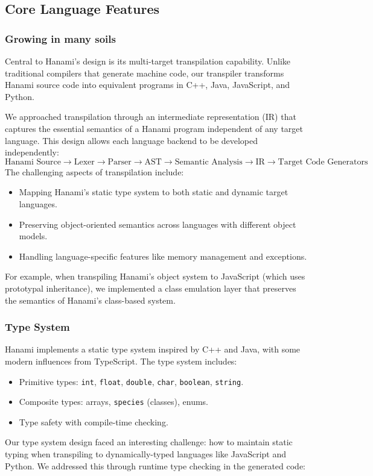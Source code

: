 \documentclass[conference]{IEEEtran}
\begin{document}
\subsection{Core Language Features}

\subsubsection{Growing in many soils}
Central to Hanami's design is its multi-target transpilation capability. Unlike traditional compilers that generate machine code, our transpiler transforms Hanami source code into equivalent programs in C++, Java, JavaScript, and Python.

We approached transpilation through an intermediate representation (IR) that captures the essential semantics of a Hanami program independent of any target language. This design allows each language backend to be developed independently:
\[
\text{Hanami Source} \rightarrow \text{Lexer} \rightarrow \text{Parser} \rightarrow \text{AST} \rightarrow \text{Semantic Analysis} \rightarrow \text{IR} \rightarrow \text{Target Code Generators}
\]
The challenging aspects of transpilation include:
\begin{itemize}
    \item Mapping Hanami's static type system to both static and dynamic target languages.
    \item Preserving object-oriented semantics across languages with different object models.
    \item Handling language-specific features like memory management and exceptions.
\end{itemize}
For example, when transpiling Hanami's object system to JavaScript (which uses prototypal inheritance), we implemented a class emulation layer that preserves the semantics of Hanami's class-based system.

\subsubsection{Type System}
Hanami implements a static type system inspired by C++ and Java, with some modern influences from TypeScript. The type system includes:
\begin{itemize}
    \item Primitive types: \texttt{int}, \texttt{float}, \texttt{double}, \texttt{char}, \texttt{boolean}, \texttt{string}.
    \item Composite types: arrays, \texttt{species} (classes), enums.
    \item Type safety with compile-time checking.
\end{itemize}
Our type system design faced an interesting challenge: how to maintain static typing when transpiling to dynamically-typed languages like JavaScript and Python. We addressed this through runtime type checking in the generated code:
\end{document}
